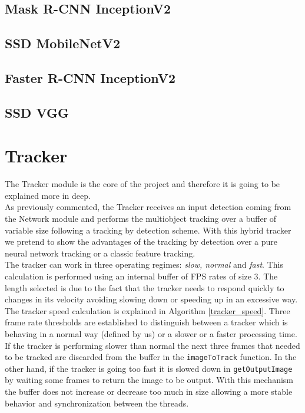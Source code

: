 \subsection{Mask R-CNN InceptionV2}
\subsection{SSD MobileNetV2}
\subsection{Faster R-CNN InceptionV2}
\subsection{SSD VGG}

\section{Tracker}
The Tracker module is the core of the project and therefore it is going to be explained more in deep.\\
As previously commented, the Tracker receives an input detection coming from the Network module and performs the multiobject tracking over a buffer of variable size following a tracking by detection scheme. With this hybrid tracker we pretend to show the advantages of the tracking by detection over a pure neural network tracking or a classic feature tracking.\\
The tracker can work in three operating regimes: \textit{slow, normal} and \textit{fast}. This calculation is performed using an internal buffer of FPS rates of size 3. The length selected is due to the fact that the tracker needs to respond quickly to changes in its velocity avoiding slowing down or speeding up in an excessive way. The tracker speed calculation is explained in Algorithm \ref{tracker_speed}. Three frame rate thresholds are established to distinguish between a tracker which is behaving in a normal way (defined by us) or a slower or a faster processing time. If the tracker is performing slower than normal the next three frames that needed to be tracked are discarded from the buffer in the \texttt{imageToTrack} function. In the other hand, if the tracker is going too fast it is slowed down in \texttt{getOutputImage} by waiting some frames to return the image to be output. With this mechanism the buffer does not increase or decrease too much in size allowing a more stable behavior and synchronization between the threads.

